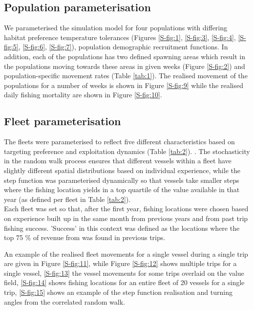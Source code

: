 \documentclass[review]{elsarticle}
\begin{document}
\subsection{Population parameterisation}

We parameterised the simulation model for four populations with differing
habitat preference temperature tolerances (Figures
\ref{S-fig:1}, \ref{S-fig:3}, \ref{S-fig:4}, \ref{S-fig:5}, \ref{S-fig:6},
\ref{S-fig:7}), population demographic recruitment functions.
In addition, each of the populations has two defined spawning areas which
result in the populations moving towards these areas in given weeks (Figure
\ref{S-fig:2}) and population-specific movement rates (Table \ref{tab:1}). The
realised movement of the populations for a number of weeks is shown in Figure
\ref{S-fig:9} while the realised daily fishing mortality are shown in Figure
\ref{S-fig:10}. \\

\subsection{Fleet parameterisation}

The fleets were parameterised to reflect five different characteristics based
on targeting preference and exploitation dynamics (Table \ref{tab:2}).
.
The stochasticity in the random walk process ensures that different vessels
within a fleet have slightly different spatial distributions based on
individual experience, while the step function was parameterised dynamically so
that vessels take smaller steps where the fishing location yields in a top
quartile of the value available in that year (as defined per fleet in Table
\ref{tab:2}). \\

Each fleet was set so that, after the first year, fishing locations were chosen
based on experience built up in the same month from previous years and from
past trip fishing success. 'Success' in this context was defined as the
locations where the top 75 \% of revenue from was found in previous trips.

An example of the realised fleet movements for a single vessel during a single
trip are given in Figure \ref{S-fig:11}, while Figure \ref{S-fig:12} shows
multiple trips for a single vessel,  \ref{S-fig:13} the
vessel movements for some trips overlaid on the value field,
 \ref{S-fig:14} shows fishing locations for an entire
fleet of 20 vessels for a single trip, 
\ref{S-fig:15} shows an example of the step function realisation and turning
angles from the correlated random walk.
\end{document}
